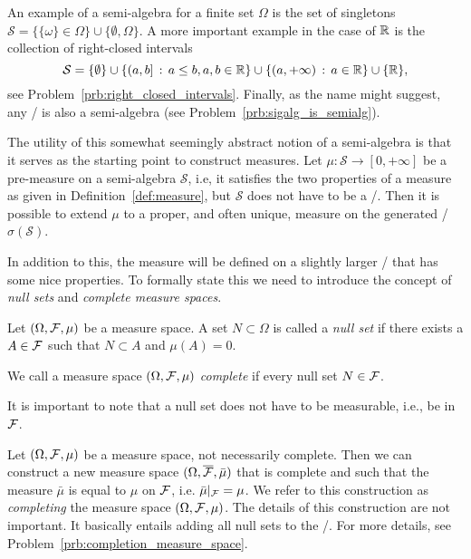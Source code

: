 An example of a semi-algebra for a finite set $\Omega$ is the set of singletons $\mathcal{S} = \{\{\omega\} \in \Omega\} \cup \{\emptyset, \Omega\}$. A more important example in the case of $\mathbb R$ is the collection of right-closed intervals
\begin{equation}\label{def:right_closed_intervals}
	\mathcal{S} = \{\emptyset\} \cup \{(a,b] \, : \, a\le b, a, b \in \mathbb R\} \cup \{(a,+\infty) \, : \, a \in \mathbb R\} \cup \{\mathbb R\},
\end{equation}
see Problem~\ref{prb:right_closed_intervals}. Finally, as the name might suggest, any \sigalg/ is also a semi-algebra (see Problem~\ref{prb:sigalg_is_semialg}).

The utility of this somewhat seemingly abstract notion of a semi-algebra is that it serves as the starting point to construct measures. Let $\mu : \mathcal{S} \to [0,+\infty]$ be a pre-measure on a semi-algebra $\mathcal{S}$, i.e, it satisfies the two properties of a measure as given in Definition~\ref{def:measure}, but $\mathcal{S}$ does not have to be a \sigalg/. Then it is possible to extend $\mu$ to a proper, and often unique, measure on the generated \sigalg/ $\sigma(\mathcal{S})$.

In addition to this, the measure will be defined on a slightly larger \sigalg/ that has some nice properties. To formally state this we need to introduce the concept of \emph{null sets} and \emph{complete measure spaces}.

\begin{definition}
Let $(\Omega, \mathcal F, \mu)$ be a measure space. A set $N \subset \Omega$ is called a \emph{null set} if there exists a $A \in \mathcal F$ such that $N \subset A$ and $\mu(A) = 0$.

We call a measure space $(\Omega, \mathcal F, \mu)$ \emph{complete} if every null set $N \in \mathcal F$. 
\end{definition}

It is important to note that a null set does not have to be measurable, i.e., be in $\mathcal F$. 

Let $(\Omega, \mathcal F, \mu)$ be a measure space, not necessarily complete. Then we can construct a new measure space $(\Omega, \overline{\mathcal F}, \bar{\mu})$ that is complete and such that the measure $\bar{\mu}$ is equal to $\mu$ on $\mathcal F$, i.e. $\bar{\mu}|_{\mathcal F} = \mu$. We refer to this construction as \emph{completing} the measure space $(\Omega, \mathcal F, \mu)$. The details of this construction are not important. It basically entails adding all null sets to the \sigalg/. For more details, see Problem~\ref{prb:completion_measure_space}.


